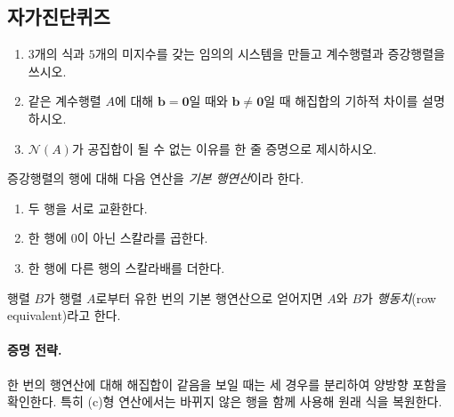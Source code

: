 \subsection*{자가진단퀴즈}
\begin{enumerate}[label=\arabic*.]
\item $3$개의 식과 $5$개의 미지수를 갖는 임의의 시스템을 만들고 계수행렬과 증강행렬을 쓰시오.
\item 같은 계수행렬 $A$에 대해 $\mathbf{b}=\mathbf{0}$일 때와 $\mathbf{b}\neq \mathbf{0}$일 때 해집합의 기하적 차이를 설명하시오.
\item $\mathcal{N}(A)$가 공집합이 될 수 없는 이유를 한 줄 증명으로 제시하시오.
\end{enumerate}


\begin{definition}
증강행렬의 행에 대해 다음 연산을 \emph{기본 행연산}이라 한다.
\begin{enumerate}[label=(\alph*)]
\item 두 행을 서로 교환한다.
\item 한 행에 $0$이 아닌 스칼라를 곱한다.
\item 한 행에 다른 행의 스칼라배를 더한다.
\end{enumerate}
\end{definition}

\begin{definition}
행렬 $B$가 행렬 $A$로부터 유한 번의 기본 행연산으로 얻어지면 $A$와 $B$가 \emph{행동치}(row equivalent)라고 한다.
\end{definition}

\paragraph{증명 전략.}
한 번의 행연산에 대해 해집합이 같음을 보일 때는 세 경우를 분리하여 양방향 포함을 확인한다. 특히 (c)형 연산에서는 바뀌지 않은 행을 함께 사용해 원래 식을 복원한다.

